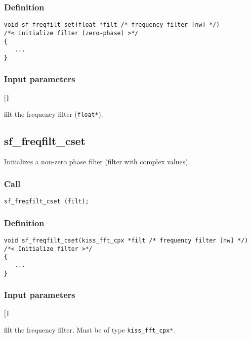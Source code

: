 \subsubsection*{Definition}
\begin{verbatim}
void sf_freqfilt_set(float *filt /* frequency filter [nw] */)
/*< Initialize filter (zero-phase) >*/
{
   ...
}
\end{verbatim}

\subsubsection*{Input parameters}
\begin{desclist}{\tt }{\quad}[\tt ]
   \setlength\itemsep{0pt}
   \item[filt] the frequency filter (\texttt{float*}).  
\end{desclist}




\subsection{{sf\_freqfilt\_cset}}
Initializes a non-zero phase filter (filter with complex values).

\subsubsection*{Call}
\begin{verbatim}sf_freqfilt_cset (filt);\end{verbatim}

\subsubsection*{Definition}
\begin{verbatim}
void sf_freqfilt_cset(kiss_fft_cpx *filt /* frequency filter [nw] */)
/*< Initialize filter >*/
{
   ...
}
\end{verbatim}

\subsubsection*{Input parameters}
\begin{desclist}{\tt }{\quad}[\tt ]
   \setlength\itemsep{0pt}
   \item[filt] the frequency filter. Must be of type \texttt{kiss\_fft\_cpx*}.  
\end{desclist}





